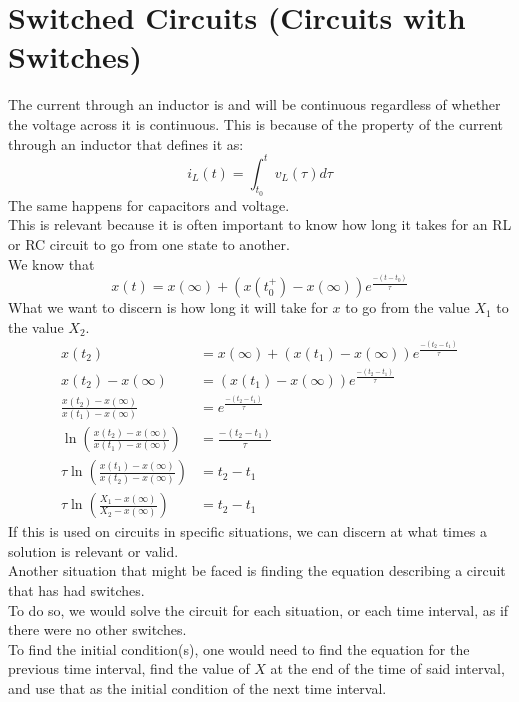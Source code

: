 \documentclass[nobib]{tufte-handout}
\begin{document}
\section{Switched Circuits (Circuits with Switches)}
The current through an inductor is and will be continuous regardless of whether
the voltage across it is continuous. This is because of the property of the
current through an inductor that defines it as:
\begin{equation*}
    i_L(t)=\int_{t_0}^t v_L(\tau)d\tau
\end{equation*}
The same happens for capacitors and voltage.\\
This is relevant because it is often important to know how long it takes for an RL or RC circuit to go from one state to another.\\
We know that
\begin{equation*}
    x(t) = x(\infty) + (x(t_0^+)-x(\infty))e^{\frac{-(t-t_0)}{\tau}}
\end{equation*}
What we want to discern is how long it will take for $x$ to go from the value $X_1$ to the value $X_2$.\\
\begin{align*}
    x(t_2)                                                        & = x(\infty) + (x(t_1)-x(\infty))e^{\frac{-(t_2-t_1)}{\tau}} \\
    x(t_2) - x(\infty)                                            & = (x(t_1)-x(\infty))e^{\frac{-(t_2-t_1)}{\tau}}             \\
    \frac{x(t_2)-x(\infty)}{x(t_1)-x(\infty)}                     & = e^{\frac{-(t_2-t_1)}{\tau}}                               \\
    \ln\left(\frac{x(t_2)-x(\infty)}{x(t_1)-x(\infty)}\right)     & = \frac{-(t_2-t_1)}{\tau}                                   \\
    \tau\ln\left(\frac{x(t_1)-x(\infty)}{x(t_2)-x(\infty)}\right) & = t_2-t_1                                                   \\
    \tau\ln\left(\frac{X_1-x(\infty)}{X_2-x(\infty)}\right)       & = t_2-t_1
\end{align*}
If this is used on circuits in specific situations, we can discern at what times a solution is relevant or valid.\\
Another situation that might be faced is finding the equation describing a circuit that has had switches.\\
To do so, we would solve the circuit for each situation, or each time interval, as if there were no other switches.\\
To find the initial condition(s), one would need to find the equation for the previous time interval, find the value of $X$ at the end of the time of said interval, and use that as the initial condition of the next time interval.\\
\end{document}
